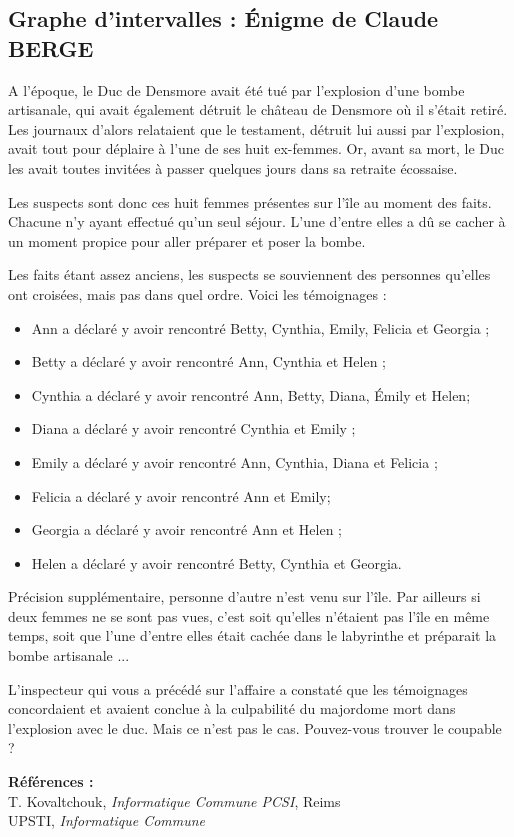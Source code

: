 \subsection{Graphe d'intervalles : Énigme de Claude BERGE}
A l'époque, le Duc de Densmore avait été tué par l'explosion d'une bombe artisanale, qui avait également détruit le château de Densmore
où il s'était retiré. Les journaux d'alors relataient que le testament, détruit lui aussi par l'explosion, avait tout pour
déplaire à l'une de ses huit ex-femmes. Or, avant sa mort, le Duc les avait toutes invitées à passer quelques jours dans sa retraite écossaise.

Les suspects sont donc ces huit femmes présentes sur l'île au moment des faits. Chacune n'y ayant effectué qu'un seul
séjour. L'une d'entre elles a dû se cacher à un moment propice pour aller préparer et poser la bombe.

Les faits étant assez anciens, les suspects se souviennent des personnes qu'elles ont croisées, mais pas dans quel ordre. Voici les témoignages :

\begin{itemize}
\item Ann a déclaré y avoir rencontré Betty, Cynthia, Emily, Felicia et Georgia ;
\item Betty a déclaré y avoir rencontré Ann, Cynthia et Helen ;
\item Cynthia a déclaré y avoir rencontré Ann, Betty, Diana, Émily et Helen;
\item Diana a déclaré y avoir rencontré Cynthia et Emily ;
\item Emily a déclaré y avoir rencontré Ann, Cynthia, Diana et Felicia ;
\item Felicia a déclaré y avoir rencontré Ann et Emily;
\item Georgia a déclaré y avoir rencontré Ann et Helen ;
\item Helen a déclaré y avoir rencontré Betty, Cynthia et Georgia.
\end{itemize}

\medskip 
Précision supplémentaire, personne d'autre n'est venu sur l'île. Par ailleurs si deux femmes ne se sont pas vues,
c'est soit qu'elles n'étaient pas l'île en même temps, soit que l'une d'entre elles était cachée dans le labyrinthe et préparait la bombe artisanale ... 

\medskip
L'inspecteur qui vous a précédé sur l'affaire a constaté que les témoignages concordaient et avaient conclue
à la culpabilité du majordome mort dans l'explosion avec le duc. Mais ce n'est pas le cas. Pouvez-vous trouver le coupable ?


\vfill
\textbf{Références :}\\
T. Kovaltchouk, \textit{Informatique Commune PCSI}, Reims\\
UPSTI, \textit{Informatique Commune}